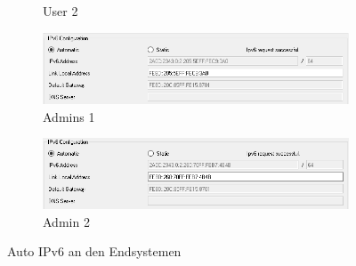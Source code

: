 \begin{figure}[!htb]
\begin{subfigure}{\textwidth}
        \caption{User 2}
    \end{subfigure}
    \begin{subfigure}{\textwidth}
        \includegraphics[width=\textwidth,height=\textwidth,keepaspectratio]{./img/admin1.png}
        \caption{Admins 1}
    \end{subfigure}
    \begin{subfigure}{\textwidth}
        \includegraphics[width=\textwidth,height=\textwidth,keepaspectratio]{./img/admin2.png}
        \caption{Admin 2}
    \end{subfigure}
    \caption{Auto IPv6 an den Endsystemen}
\end{figure}
